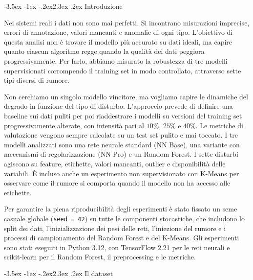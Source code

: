 \documentclass[12pt,a4paper]{article}
\makeatletter
\renewcommand\section{\@startsection{section}{1}{\z@}%
  {-3.5ex \@plus -1ex \@minus -.2ex}{2.3ex \@plus.2ex}%
  {\normalfont\Large\bfseries}}
\makeatother
\begin{document}
\section{Introduzione}\label{sec:intro}

Nei sistemi reali i dati non sono mai perfetti. Si incontrano misurazioni
imprecise, errori di annotazione, valori mancanti e anomalie di ogni tipo.
L'obiettivo di questa analisi non è trovare il modello più accurato su dati
ideali, ma capire quanto ciascun algoritmo regge quando la qualità dei dati
peggiora progressivamente. Per farlo, abbiamo misurato la robustezza di tre
modelli supervisionati corrompendo il training set in modo controllato,
attraverso sette tipi diversi di rumore.

Non cerchiamo un singolo modello vincitore, ma vogliamo capire le dinamiche del
degrado in funzione del tipo di disturbo. L'approccio prevede di definire una 
baseline sui dati puliti per poi 
riaddestrare i modelli su versioni del training set progressivamente 
alterate, con intensità pari al $10\%$, $25\%$ e $40\%$. 
Le metriche di valutazione vengono sempre calcolate su un test set
pulito e mai toccato. I tre modelli analizzati sono una rete neurale standard
(NN Base), una variante con meccanismi di regolarizzazione (NN Pro) e un Random
Forest. I sette disturbi agiscono su feature, etichette, valori mancanti,
outlier e disponibilità delle variabili. È incluso anche un esperimento non
supervisionato con K-Means per osservare come il rumore si comporta quando il
modello non ha accesso alle etichette.

Per garantire la piena riproducibilità degli esperimenti è stato fissato un seme
casuale globale (\texttt{seed = 42}) su tutte le componenti stocastiche, che
includono lo split dei dati, l'inizializzazione dei pesi delle reti, l'iniezione
del rumore e i processi di campionamento del Random Forest e del K-Means.
Gli esperimenti sono stati eseguiti in Python 3.12, con TensorFlow 2.21 per le
reti neurali e scikit-learn per il Random Forest, il preprocessing e le
metriche.

\section{Il dataset}\label{sec:dataset}
\end{document}
